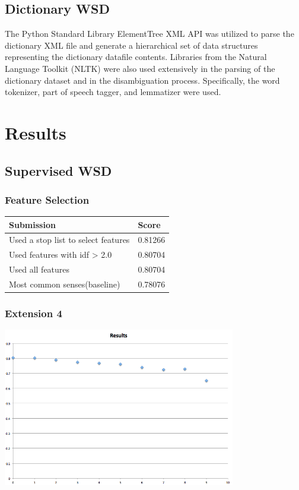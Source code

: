 \documentclass[11pt]{article}
\begin{document}
\subsection{Dictionary WSD}
The Python Standard Library ElementTree XML API was utilized to parse the dictionary XML file and generate a hierarchical set of data structures representing the dictionary datafile contents. Libraries from the Natural Language Toolkit (NLTK) were also used extensively in the parsing of the dictionary dataset and in the disambiguation process. Specifically, the word tokenizer, part of speech tagger, and lemmatizer were used.

\section{Results}
\subsection{Supervised WSD}

\subsubsection{Feature Selection}
\begin{center}
\begin{table}
    \begin{tabular}{|l|l|}
    \hline
    Submission                          & Score   \\ \hline
    Used a stop list to select features & 0.81266 \\
    Used features with idf > 2.0        & 0.80704 \\
    Used all features                   & 0.80704 \\
    Most common senses(baseline)        & 0.78076 \\ \hline
    \end{tabular}
\end{table}
\end{center}

\subsubsection{Extension 4}
\includegraphics[width = 4in]{data_plot.png}
\end{document}
